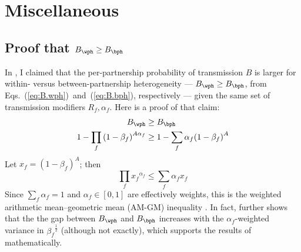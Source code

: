 \section{Miscellaneous}\label{app.math.misc}
\subsection{Proof that $B_{\wph} \ge B_{\bph}$}\label{app.math.misc.xph}
In , I claimed that
the per-partnership probability of transmission $B$ is larger for
within- versus between-partnership heterogeneity
--- $B_{\wph} \ge B_{\bph}$, from Eqs.~(\ref{eq:B.wph})~and~(\ref{eq:B.bph}), respectively ---
given the same set of transmission modifiers $R_f, \alpha_f$.
Here is a proof of that claim:
\begin{equation}
  \begin{aligned}
    B_{\wph} &\ge B_{\bph} \\
    1 - \prod_f {(1 - \beta_f)}^{A\alpha_f} &\ge 1 - \sum_f \alpha_f {(1 - \beta_f)}^{A}
  \end{aligned}
\end{equation}
Let $x_f = {(1 - \beta_f)}^A$; then
\begin{equation}
  \prod_f {x_f}^{\alpha_f} \le \sum_f \alpha_f x_f
\end{equation}
Since $\sum_f \alpha_f = 1$ and $\alpha_f \in [0,1]$ are effectively weights,
this is the weighted arithmetic mean--geometric mean (AM-GM) inequality \cite{Aldaz2009}.
In fact, \citet{Aldaz2009} further shows that the the gap between $B_{\wph}$ and $B_{\bph}$
increases with the $\alpha_f$-weighted variance in ${\beta_f}^{\frac12}$ (although not exactly),
which supports the results of  mathematically.
